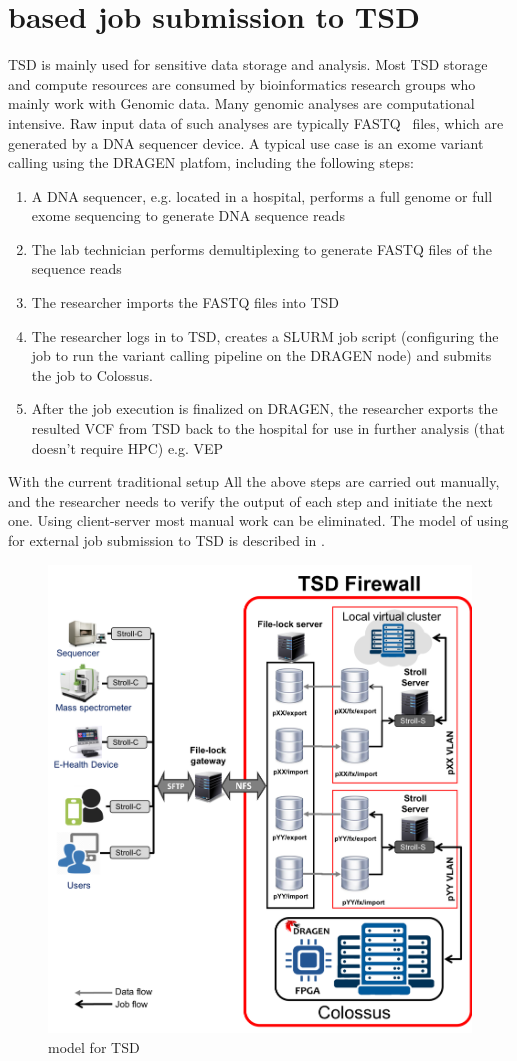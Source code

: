 \section{\name based job submission to TSD}
\label{sec:stroll-tsd}

TSD is mainly used for sensitive data storage and analysis. Most TSD storage and compute resources are consumed by bioinformatics research groups who mainly work with Genomic data. Many genomic analyses are computational intensive. Raw input data of such analyses are typically FASTQ~\cite{fastq} files, which are generated by a DNA sequencer device. A typical use case is an exome variant calling using the DRAGEN platfom, including the following steps:
\begin{enumerate}
	\item A DNA sequencer, e.g. located in a hospital, performs a full genome or full exome sequencing to generate DNA sequence reads 
	\item The lab technician performs demultiplexing to generate FASTQ files of the sequence reads
	\item The researcher imports the FASTQ files into TSD
	\item The researcher logs in to TSD, creates a SLURM job script (configuring the job to run the variant calling pipeline on the DRAGEN node) and submits the job to Colossus.
	\item After the job execution is finalized on DRAGEN, the researcher exports the resulted VCF from TSD back to the hospital for use in further analysis (that doesn't require HPC) e.g. VEP~\cite{vep}   
\end{enumerate}

With the current traditional setup All the above steps are carried out manually, and the researcher needs to verify the output of each step and initiate the next one. Using \name client-server most manual work can be eliminated. The model of using \name for external job submission to TSD is described in .

\begin{figure}[hbt]
	\centering
	\includegraphics[width=.5\textwidth]{figures/tsd-model}                
	\caption{\name model for TSD }
	\label{fig:stroll-tsd}
\end{figure}

